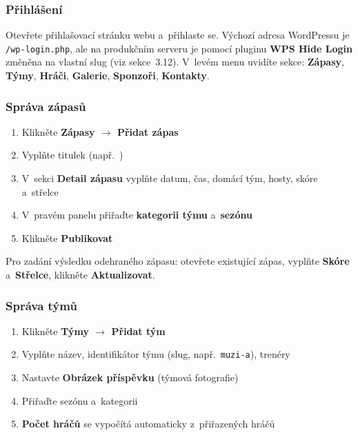 \documentclass[12pt,a4paper]{article}
\begin{document}
\subsubsection{Přihlášení}

Otevřete přihlašovací stránku webu a~přihlaste se. Výchozí adresa WordPressu je \texttt{/wp-login.php}, ale na produkčním serveru je pomocí pluginu \textbf{WPS Hide Login} změněna na vlastní slug (viz sekce~3.12). V~levém menu uvidíte sekce: \textbf{Zápasy}, \textbf{Týmy}, \textbf{Hráči}, \textbf{Galerie}, \textbf{Sponzoři}, \textbf{Kontakty}.

\subsubsection{Správa zápasů}

\begin{enumerate}
    \item Klikněte \textbf{Zápasy $\rightarrow$ Přidat zápas}
    \item Vyplňte titulek (např.\ )
    \item V~sekci \textbf{Detail zápasu} vyplňte datum, čas, domácí tým, hosty, skóre a~střelce
    \item V~pravém panelu přiřaďte \textbf{kategorii týmu} a~\textbf{sezónu}
    \item Klikněte \textbf{Publikovat}
\end{enumerate}

Pro zadání výsledku odehraného zápasu: otevřete existující zápas, vyplňte \textbf{Skóre} a~\textbf{Střelce}, klikněte \textbf{Aktualizovat}.

\subsubsection{Správa týmů}

\begin{enumerate}
    \item Klikněte \textbf{Týmy $\rightarrow$ Přidat tým}
    \item Vyplňte název, identifikátor týmu (slug, např.\ \texttt{muzi-a}), trenéry
    \item Nastavte \textbf{Obrázek příspěvku} (týmová fotografie)
    \item Přiřaďte sezónu a~kategorii
    \item \textbf{Počet hráčů} se vypočítá automaticky z~přiřazených hráčů
\end{enumerate}
\end{document}
